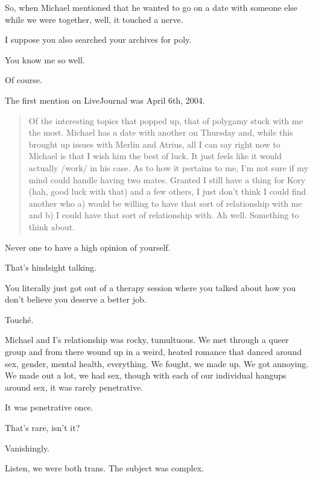 \begin{leftcolumn}
So, when Michael mentioned that he wanted to go on a date with someone else while we were together, well, it touched a nerve.
\newpage

\begin{ally}
I suppose you also searched your archives for poly.
\end{ally}
You know me so well.

\begin{ally}
Of course.
\end{ally}
The first mention on LiveJournal was April 6th, 2004.

\begin{quotation}
Of the interesting topics that popped up, that of polygamy stuck with me the most.  Michael has a date with another on Thursday and, while this brought up issues with Merlin and Atrius, all I can say right now to Michael is that I wish him the best of luck.  It just feels like it would actually /work/ in his case.  As to how it pertains to me, I'm not sure if my mind could handle having two mates.  Granted I still have a thing for Kory (hah, good luck with that) and a few others, I just don't think I could find another who a) would be willing to have that sort of relationship with me and b) I could have that sort of relationship with.  Ah well.  Something to think about.
\end{quotation}

\begin{ally}
Never one to have a high opinion of yourself.
\end{ally}
That's hindsight talking.

\begin{ally}
You literally just got out of a therapy session where you talked about how you don't believe you deserve a better job.
\end{ally}
Touché.

Michael and I's relationship was rocky, tumultuous. We met through a queer group and from there wound up in a weird, heated romance that danced around sex, gender, mental health, everything. We fought, we made up. We got annoying. We made out a lot, we had sex, though with each of our individual hangups around sex, it was rarely penetrative.

\begin{ally}
It was penetrative once.
\end{ally}
That's rare, isn't it?

\begin{ally}
Vanishingly.
\end{ally}
Listen, we were both trans. The subject was complex.


\end{leftcolumn}
